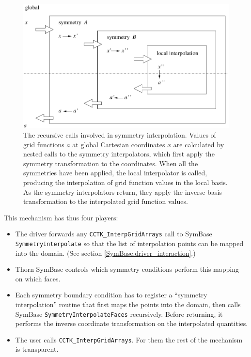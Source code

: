 \begin{figure}[tb]
\begin{center}
\includegraphics[scale=.833,clip=true]{fig/recursion}
\end{center}
\caption[Symmetry interpolation] {
	  The recursive calls involved in symmetry interpolation.
	  Values of grid functions $a$ at global Cartesian coordinates $x$ are 
	  calculated by nested calls to the symmetry interpolators, which first
	  apply the symmetry transformation to the coordinates.  When all
	  the symmetries have been applied, the local interpolator is called,
	  producing the interpolation of grid function values in the local basis.
	  As the symmetry interpolators return, they apply the inverse basis
	  transformation to the interpolated grid function values.
}
\label{SymBase.recursion}
\end{figure}

This mechanism has thus four players:
\begin{itemize}
	\item The driver forwards any \texttt{CCTK\_InterpGridArrays} call
	  to SymBase \texttt{SymmetryInterpolate} so that the list of
	  interpolation points can be mapped into the domain. (See section
	  \ref{SymBase.driver_interaction}.)
	\item Thorn SymBase controls which symmetry conditions perform this
	  mapping on which faces.
	\item Each symmetry boundary condition has to register a ``symmetry
	  interpolation'' routine that first maps the points into the domain,
	  then calls SymBase \texttt{SymmetryInterpolateFaces} recursively.
	  Before returning, it performs the inverse coordinate transformation
	  on the interpolated quantities.
	\item The user calls \texttt{CCTK\_InterpGridArrays}.  For them
	  the rest of the mechanism is transparent.
\end{itemize}



